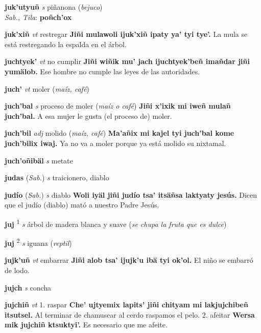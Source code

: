 \documentclass[10pt]{scrbook}
\newcommand{\entry}[1]{\textbf{#1}}
\newcommand{\onedefinition}[1]{#1.}
\newcommand{\defsuperscript}[1]{\textsuperscript{#1}}
\newcommand{\partofspeech}[1]{\textit{#1}}
\newcommand{\spanishtranslation}[1]{#1}
\newcommand{\clarification}[1]{(\textit{#1})}
\newcommand{\cholexample}[1]{\textbf{#1}}
\newcommand{\exampletranslation}[1]{#1}
\newcommand{\dialectvariant}[1]{\\\textit{#1}:}
\newcommand{\dialectword}[1]{\textbf{#1}}
\newcommand{\relevantdialect}[1]{(\textit{#1})}
\begin{document}
\begin{multicols}{2}
\entry{juk'utyuñ}
\partofspeech{s}
\spanishtranslation{piñanona}
\clarification{bejuco}
\dialectvariant{Sab., Tila}
\dialectword{poñch'ox}

\entry{juk'xiñ}
\partofspeech{vt}
\spanishtranslation{restregar}
\cholexample{Jiñi mulawoli ijuk'xiñ ipaty ya' tyi tye'.}
\exampletranslation{La mula se está restregando la espalda en el árbol.}

\entry{juchtyek'}
\partofspeech{vt}
\spanishtranslation{no cumplir}
\cholexample{Jiñi wiñik mu' jach ijuchtyek'beñ imañdar jiñi yumälob.}
\exampletranslation{Ese hombre no cumple las leyes de las autoridades.}

\entry{juch'}
\partofspeech{vt}
\spanishtranslation{moler}
\clarification{maíz, café}

\entry{juch'bal}
\partofspeech{s}
\spanishtranslation{proceso de moler}
\clarification{maíz o café}
\cholexample{Jiñi x'ixik mi iweñ mulañ juch'bal.}
\exampletranslation{A esa mujer le gusta (el proceso de) moler.}

\entry{juch'bil}
\partofspeech{adj}
\spanishtranslation{molido}
\clarification{maíz, café}
\cholexample{Ma'añix mi kajel tyi juch'bal kome juch'bilix iwaj.}
\exampletranslation{Ya no va a moler porque ya está molido su nixtamal.}

\entry{juch'oñibäl}
\partofspeech{s}
\spanishtranslation{metate}

\entry{judas}
\relevantdialect{Sab.}
\partofspeech{s}
\spanishtranslation{traicionero, diablo}

\entry{judío}
\relevantdialect{Sab.}
\partofspeech{s}
\spanishtranslation{diablo}
\cholexample{Woli iyäl jiñi judío tsa' itsäñsa laktyaty jesús.}
\exampletranslation{Dicen que el judío (diablo) mató a nuestro Padre Jesús.}

\entry{juj}
\defsuperscript{1}
\partofspeech{s}
\spanishtranslation{árbol de madera blanca y suave}
\clarification{se chupa la fruta que es dulce}

\entry{juj}
\defsuperscript{2}
\partofspeech{s}
\spanishtranslation{iguana}
\clarification{reptil}

\entry{jujk'uñ}
\partofspeech{vt}
\spanishtranslation{embarrar}
\cholexample{Jiñi alob tsa' ijujk'u ibä tyi ok'ol.}
\exampletranslation{El niño se embarró de lodo.}

\entry{jujch}
\partofspeech{s}
\spanishtranslation{concha}

\entry{jujchiñ}
\partofspeech{vt}
\onedefinition{1}
\spanishtranslation{raspar}
\cholexample{Che' ujtyemix lapits' jiñi chityam mi lakjujchibeñ itsutsel.}
\exampletranslation{Al terminar de chamuscar al cerdo raspamos el pelo.}
\onedefinition{2}
\spanishtranslation{afeitar}
\cholexample{Wersa mik jujchiñ ktsuktyi'.}
\exampletranslation{Es necesario que me afeite.}


\end{multicols}
\end{document}
